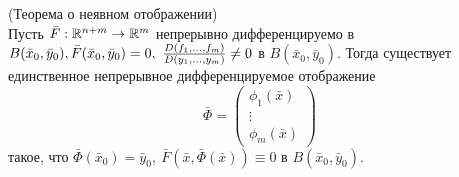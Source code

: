 \begin{theorem} (Теорема о неявном отображении)\\
    Пусть $\bar{F}: \mathbb{R}^{n+m}\to \mathbb{R}^m$ непрерывно дифференцируемо в $B(\bar{x}_0,\bar{y}_0),\\ \bar{F}(\bar{x}_0, \bar{y}_0)=0,\ \frac{D(f_1,\dots, f_m)}{D(y_1,\dots,y_m)}\ne 0$ в $B(\bar{x}_0, \bar{y}_0)$. Тогда существует единственное непрерывное дифференцируемое отображение
    \[\bar{\Phi}=\begin{pmatrix}
        \phi_1(\bar{x})\\
        \vdots\\
        \phi_m(\bar{x})
    \end{pmatrix}
    \]
    такое, что $\bar{\Phi}(\bar{x}_0)=\bar{y}_0,\ \bar{F}(\bar{x}, \bar{\Phi}(\bar{x}))\equiv 0$ в $B(\bar{x}_0, \bar{y}_0)$.
\end{theorem} 
